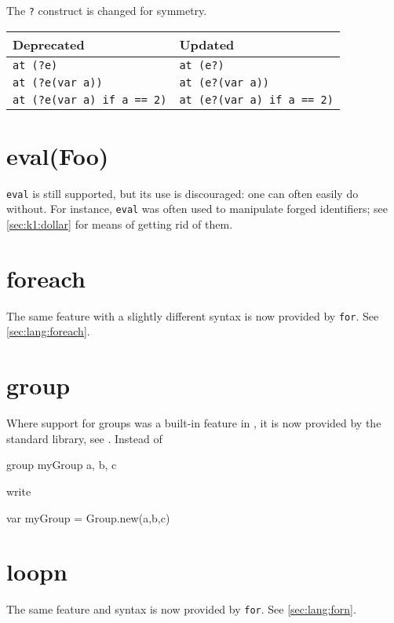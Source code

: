 The \lstinline{?} construct is changed for symmetry.

\begin{center}
  \begin{tabular}{|l|l|}
    \hline
    \textbf{Deprecated} & \textbf{Updated}  \\
    \hline
    \lstinline|at (?e)|                  & \lstinline|at (e?)|\\
    \lstinline|at (?e(var a))|           & \lstinline|at (e?(var a))|\\
    \lstinline|at (?e(var a) if a == 2)| & \lstinline|at (e?(var a) if a == 2)|\\
    \hline
  \end{tabular}
\end{center}


\section{eval(Foo)}
\lstinline{eval} is still supported, but its use is discouraged: one
can often easily do without.  For instance, \lstinline{eval} was often
used to manipulate forged identifiers; see \autoref{sec:k1:dollar}
for means of getting rid of them.

\section{foreach}
The same feature with a slightly different syntax is now provided by
\lstinline|for|.  See \autoref{sec:lang:foreach}.

\section{group}
Where support for groups was a built-in feature in , it is now
provided by the standard library, see .  Instead of
\begin{urbiunchecked}
group myGroup {a, b, c}
\end{urbiunchecked}
\noindent
write
\begin{urbiunchecked}
var myGroup = Group.new(a,b,c)
\end{urbiunchecked}

\section{loopn}
\label{sec:k1:loopn}
The same feature and syntax is now provided by \lstinline|for|.  See
\autoref{sec:lang:forn}.

